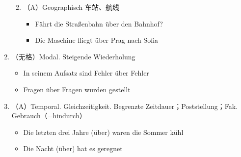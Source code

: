 \documentclass[UTF8]{report}
\begin{document}
\begin{enumerate}
\begin{enumerate}
\begin{itemize}
\begin{figure}[H]
            \end{figure}
        \end{itemize}
        \item（A）Geographisch 车站、航线
        \begin{itemize}
            \item Fährt die Straßenbahn über den Bahnhof?
            \item Die Maschine fliegt über Prag nach Sofia
        \end{itemize}
    \end{enumerate}
    \item（无格）Modal. Steigende Wiederholung
    \begin{itemize}
        \item In seinem Aufsatz sind Fehler über Fehler
        \item Fragen über Fragen wurden gestellt
    \end{itemize}
    \item（A）Temporal. Gleichzeitigkeit. Begrenzte Zeitdauer；Poststellung；Fak. Gebrauch（=hindurch）
    \begin{itemize}
        \item Die letzten drei Jahre (über) waren die Sommer kühl
        \item Die Nacht (über) hat es geregnet
    \end{itemize}
\end{enumerate}
\end{document}
